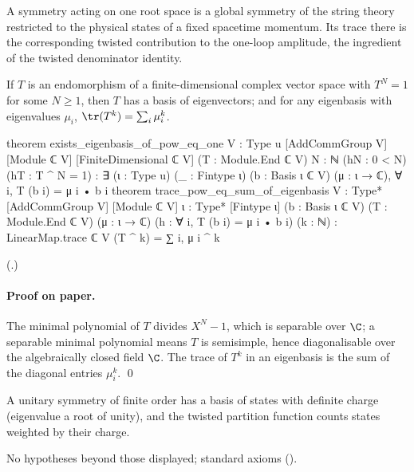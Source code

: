 \begin{physics}
A symmetry acting on one root space is a global symmetry of the string theory restricted to the physical states of a
fixed spacetime momentum. Its trace there is the corresponding twisted contribution to the one-loop amplitude, the
ingredient of the twisted denominator identity.
\end{physics}

\begin{theorem}\label{ch19:thm:eigen}
If $T$ is an endomorphism of a finite-dimensional complex vector space with $T^N=1$ for some $N\ge1$, then $T$ has a basis of
eigenvectors; and for any eigenbasis with eigenvalues $\mu_i$, $\tr(T^k)=\sum_i\mu_i^k$.
\end{theorem}
\begin{leancode}
theorem exists_eigenbasis_of_pow_eq_one {V : Type u} [AddCommGroup V] [Module ℂ V]
    [FiniteDimensional ℂ V] (T : Module.End ℂ V) {N : ℕ} (hN : 0 < N) (hT : T ^ N = 1) :
    ∃ (ι : Type u) (_ : Fintype ι) (b : Basis ι ℂ V) (μ : ι → ℂ), ∀ i, T (b i) = μ i • b i
theorem trace_pow_eq_sum_of_eigenbasis {V : Type*} [AddCommGroup V] [Module ℂ V]
    {ι : Type*} [Fintype ι] (b : Basis ι ℂ V) (T : Module.End ℂ V) (μ : ι → ℂ)
    (h : ∀ i, T (b i) = μ i • b i) (k : ℕ) :
    LinearMap.trace ℂ V (T ^ k) = ∑ i, μ i ^ k
\end{leancode}
(.)
\paragraph{Proof on paper.}  The minimal polynomial of $T$ divides $X^N-1$, which is separable over $\C$; a separable
minimal polynomial means $T$ is semisimple, hence diagonalisable over the algebraically closed field $\C$.  The trace of
$T^k$ in an eigenbasis is the sum of the diagonal entries $\mu_i^k$. \qed
\begin{physics}A unitary symmetry of finite order has a basis of states with definite charge (eigenvalue a root of unity),
and the twisted partition function counts states weighted by their charge.\end{physics}
\begin{status}No hypotheses beyond those displayed; standard axioms ().\end{status}

